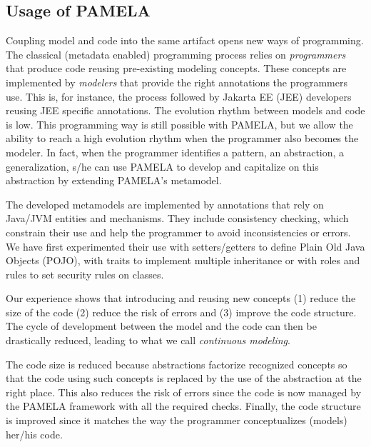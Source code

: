\subsection{Usage of PAMELA}

Coupling model and code into the same artifact opens new ways of programming. The classical (metadata enabled) programming process relies on \emph{programmers} that produce code reusing pre-existing modeling concepts. These concepts are implemented by \emph{modelers} that provide the right annotations the programmers use. This is, for instance, the process followed by Jakarta EE (JEE) developers reusing JEE specific annotations. 
The evolution rhythm between models and code is low. This programming way is still possible with PAMELA, but we allow the ability to reach a high evolution rhythm when the programmer also becomes the modeler. In fact, when the programmer identifies a pattern, an abstraction, a generalization, s/he can use PAMELA to develop and capitalize on this abstraction by extending PAMELA's metamodel. 

The developed metamodels are implemented by annotations that rely on Java/JVM entities and mechanisms. They include consistency checking, which constrain their use and help the programmer to avoid inconsistencies or errors. We have first experimented their use with setters/getters to define Plain Old Java Objects (POJO), with traits to implement multiple inheritance or with roles and rules to set security rules on classes.

Our experience shows that introducing and reusing new concepts (1) reduce the size of the code (2) reduce the risk of errors and (3) improve the code structure. The cycle of development between the model and the code can then be drastically reduced, leading to what we call \emph{continuous modeling}.

The code size is reduced because abstractions factorize recognized concepts so that the code using such concepts is replaced by the use of the abstraction at the right place. This also reduces the risk of errors since the code is now managed by the PAMELA framework with all the required checks. Finally, the code structure is improved since it matches the way the programmer conceptualizes (models) her/his code.

